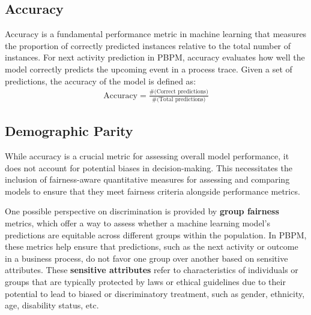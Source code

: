 \subsection{Accuracy}
Accuracy is a fundamental performance metric in machine learning
that measures the proportion of correctly predicted instances relative to the total number of instances.
For next activity prediction in PBPM,
accuracy evaluates how well the model correctly predicts the upcoming event in a process trace.
Given a set of predictions, the accuracy of the model is defined as:
\begin{align}
\text{Accuracy} = \frac{\text{\#(Correct predictions)}}{\text{\#(Total predictions)}}
\end{align}


\subsection{Demographic Parity}
While accuracy is a crucial metric for assessing overall model performance,
it does not account for potential biases in decision-making.
This necessitates the inclusion of fairness-aware quantitative measures
for assessing and comparing models to ensure that they meet fairness criteria
alongside performance metrics.

One possible perspective on discrimination is provided by \textbf{group fairness} metrics,
which offer a way to assess whether a machine learning model's predictions are equitable across different groups within the population.
In PBPM, these metrics help ensure that predictions, such as the next activity or outcome in a business process,
do not favor one group over another based on sensitive attributes.
These \textbf{sensitive attributes} refer to characteristics of individuals or groups
that are typically protected by laws or ethical guidelines due to their potential to lead to biased or discriminatory treatment,
such as gender, ethnicity, age, disability status, etc.

